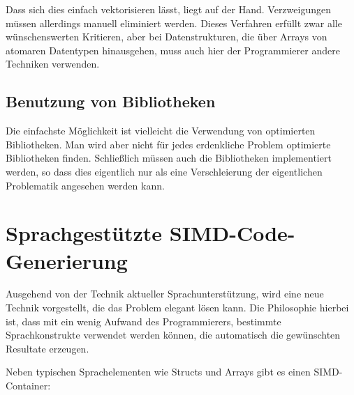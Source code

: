 \documentclass[a4paper,10pt]{article}
\begin{document}
Dass sich dies einfach vektorisieren lässt, liegt auf der Hand. Verzweigungen müssen allerdings
manuell eliminiert werden. Dieses Verfahren erfüllt zwar alle wünschenswerten Kritieren, aber bei
Datenstrukturen, die über Arrays von atomaren Datentypen hinausgehen, muss auch hier der
Programmierer andere Techniken verwenden.

\subsection{Benutzung von Bibliotheken}

Die einfachste Möglichkeit ist vielleicht die Verwendung von optimierten Bibliotheken. Man wird aber
nicht für jedes erdenkliche Problem optimierte Bibliotheken finden. Schließlich müssen auch die
Bibliotheken implementiert werden, so dass dies eigentlich nur als eine Verschleierung der
eigentlichen Problematik angesehen werden kann.

\newpage
\section{Sprachgestützte SIMD-Code-Generierung}

Ausgehend von der Technik aktueller Sprachunterstützung, wird eine neue Technik vorgestellt, die das Problem
elegant lösen kann. Die Philosophie hierbei ist, dass mit ein wenig Aufwand des Programmierers, bestimmte
Sprachkonstrukte verwendet werden können, die automatisch die gewünschten Resultate erzeugen.

Neben typischen Sprachelementen wie Structs und Arrays gibt es einen SIMD-Container:
\end{document}
